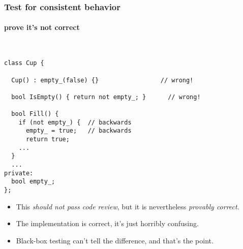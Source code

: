 \begin{frame}[fragile,t]
\frametitle{Test for consistent behavior}
\framesubtitle{prove it's not correct}
{\scriptsize\
\begin{verbatim}
class Cup {

  Cup() : empty_(false) {}                 // wrong!

  bool IsEmpty() { return not empty_; }      // wrong!

  bool Fill() { 
    if (not empty_) {  // backwards
      empty_ = true;   // backwards
      return true;
    ...
  }
  ...
private:
  bool empty_;
};
\end{verbatim}}
\vskip 6pt
\begin{itemize}
\item This \emph{should not pass code review}, but it is nevertheless
\emph{provably correct}.

\item The implementation is correct, it's just horribly confusing.

\item Black-box testing can't tell the difference, and that's the point.
\end{itemize}
\end{frame}


